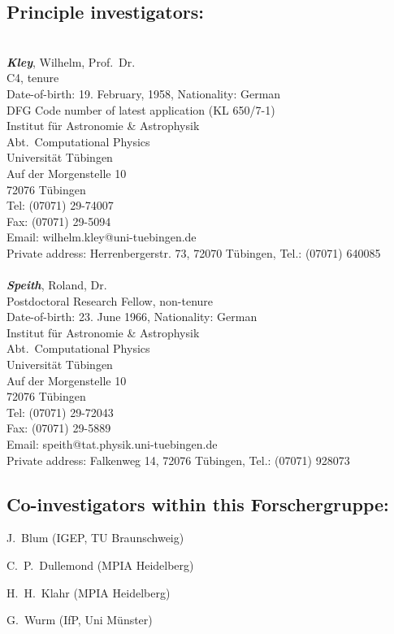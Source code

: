 \subsection{Principle investigators:}
\hspace{-\baselineskip}\\\noindent
%
{\bfseries\itshape Kley}, Wilhelm, Prof.~Dr.\\
C4, tenure\\
Date-of-birth: 19. February, 1958, Nationality: German\\
DFG Code number of latest application (KL 650/7-1)\\
Institut f\"ur Astronomie \& Astrophysik\\
Abt.\ Computational Physics\\
Universit\"at T\"ubingen\\
Auf der Morgenstelle 10\\
72076 T\"ubingen\\
Tel: (07071) 29-74007\\
Fax:  (07071) 29-5094\\
Email: wilhelm.kley@uni-tuebingen.de\\
Private address: Herrenbergerstr. 73, 72070 T\"ubingen, Tel.: (07071)  
640085\\
\vspace{1em}\\\noindent
{\bfseries\itshape Speith}, Roland, Dr.\\
Postdoctoral Research Fellow, non-tenure\\
Date-of-birth: 23. June 1966, Nationality: German\\
Institut f\"ur Astronomie \& Astrophysik\\
Abt.\ Computational Physics\\
Universit\"at T\"ubingen\\
Auf der Morgenstelle 10\\
72076 T\"ubingen\\
Tel: (07071) 29-72043\\
Fax: (07071) 29-5889\\
Email: speith@tat.physik.uni-tuebingen.de\\
Private address: Falkenweg 14, 72076 T\"ubingen, Tel.: (07071) 928073
\subsection{Co-investigators within this Forschergruppe:}
\begin{coilist}
\item J.~Blum (IGEP, TU Braunschweig)
\item C.~P.~Dullemond (MPIA Heidelberg)
\item H.~H.~Klahr (MPIA Heidelberg)
\item G.~Wurm (IfP, Uni M\"unster)
\end{coilist}
